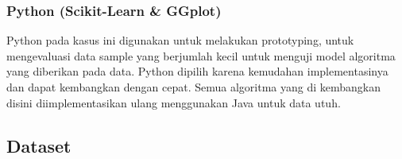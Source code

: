 \documentclass{article}
\begin{document}
\subsubsection{Python (Scikit-Learn \& GGplot)}
\begin{adjustwidth}{4em}{0pt}
		
\hspace{\parindent}Python pada kasus ini digunakan untuk melakukan prototyping, untuk mengevaluasi data sample yang berjumlah kecil untuk menguji model algoritma yang diberikan pada data. Python dipilih karena kemudahan implementasinya dan dapat kembangkan dengan cepat. Semua algoritma yang di  kembangkan disini diimplementasikan ulang menggunakan Java untuk data utuh.

\end{adjustwidth}

\subsection{Dataset}
\end{document}
